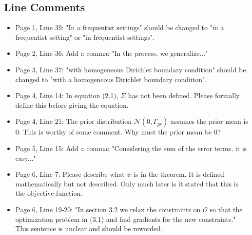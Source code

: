 \documentclass{amsart}
\begin{document}
\subsection{Line Comments}

\begin{itemize}
\item Page 1, Line 39: "In a frequentist settings" should be changed
  to "in a frequentist setting" or "in frequentist
  settings".

\item Page 2, Line 36: Add a comma: "In the process, we generalize..."
  
\item Page 3, Line 37: "with homogeneous Dirichlet boundary condition"
  should be changed to "with a homogeneous Dirichlet boundary
  condiiton". 

\item Page 4, Line 14: In equation (2.1), $\Sigma$ has not been
  defined. Please formally define this before giving the equation.

\item Page 4, Line 21: The prior distribution $\mathcal{N}(0,
  \Gamma_{pr})$ assumes the prior mean is 0. This is worthy of some
  comment. Why must the prior mean be 0?

\item Page 5, Line 15: Add a comma: "Considering the sum of the error
  terms, it is easy..."

  
\item Page 6, Line 7: Please describe what $\psi$ is in the
  theorem. It is defined mathematically but not described. Only much
  later is it stated that this is the objective function.

\item Page 6, Line 19-20: "In section 3.2 we relax the constraints on
  $\mathcal{O}$ so that the optimization problem in (3.1) and find
  gradients for the new constraints." This sentence is unclear and
  should be reworded.


\end{itemize}
\end{document}
